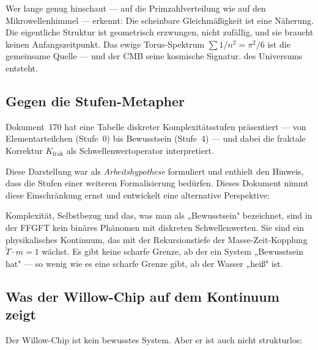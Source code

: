Wer lange genug hinschaut — auf die Primzahlverteilung wie auf den Mikrowellenhimmel
— erkennt: Die scheinbare Gleichmäßigkeit ist eine Näherung. Die eigentliche
Struktur ist geometrisch erzwungen, nicht zufällig, und sie braucht keinen
Anfangszeitpunkt. Das ewige Torus-Spektrum $\sum 1/n^2 = \pi^2/6$ ist
die gemeinsame Quelle — und der CMB seine kosmische Signatur.
des Universums entsteht.

\subsection{Gegen die Stufen-Metapher}

Dokument~170 hat eine Tabelle diskreter Komplexitätsstufen präsentiert — von
Elementarteilchen (Stufe~0) bis Bewusstsein (Stufe~4) — und dabei die fraktale
Korrektur $K_\text{frak}$ als Schwellenwertoperator interpretiert.

Diese Darstellung war als \textit{Arbeitshypothese} formuliert und enthielt den
Hinweis, dass die Stufen einer weiteren Formalisierung bedürfen. Dieses Dokument
nimmt diese Einschränkung ernst und entwickelt eine alternative Perspektive:

\begin{important}
Komplexität, Selbstbezug und das, was man als „Bewusstsein" bezeichnet, sind in
der FFGFT kein binäres Phänomen mit diskreten Schwellenwerten.
Sie sind ein physikalisches Kontinuum, das mit der Rekursionstiefe der
Masse-Zeit-Kopplung $\tilde{T} \cdot m = 1$ wächst.
Es gibt keine scharfe Grenze, ab der ein System „Bewusstsein hat" — so wenig wie
es eine scharfe Grenze gibt, ab der Wasser „heiß" ist.
\end{important}

\subsection{Was der Willow-Chip auf dem Kontinuum zeigt}

Der Willow-Chip ist kein bewusstes System. Aber er ist auch nicht strukturlos:

